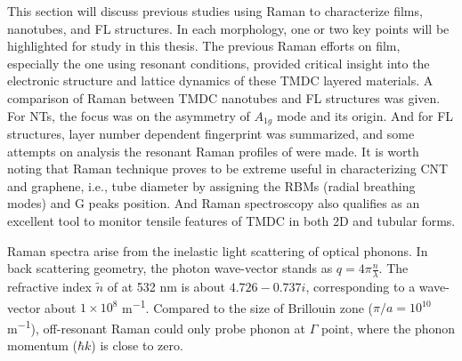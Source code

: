 This section will discuss previous studies using Raman to characterize  films, nanotubes, and FL structures. In each morphology, one or two key points will be highlighted for study in this thesis. The previous Raman efforts on  film, especially the one using resonant conditions, provided critical insight into the electronic structure and lattice dynamics of these TMDC layered materials. A comparison of Raman between TMDC nanotubes and FL structures was given. For  NTs, the focus was on the asymmetry of $A_{1g}$ mode and its origin. And for  FL structures, layer number dependent fingerprint was summarized, and some attempts on analysis the resonant Raman profiles of  were made. It is worth noting that Raman technique proves to be extreme useful in characterizing CNT and graphene, i.e., tube diameter by assigning the RBMs (radial breathing modes) and G peaks position.\cite{Bonaccorso2013} And Raman spectroscopy also qualifies as an excellent tool to monitor tensile features of TMDC in both 2D and tubular forms.\cite{Tang2013} 

Raman spectra arise from the inelastic light scattering of optical phonons. In back scattering geometry, the photon wave-vector stands as $q = 4\pi\frac{n}{\lambda}$. The refractive index $\tilde{n}$ of  at 532 nm is about $4.726 - 0.737i$,\cite{Beal1976, Peimyoo2013} corresponding to a wave-vector about $1\times10^8$ \si{m^{-1}}. Compared to the size of Brillouin zone ($\pi/a = 10^{10}$ \si{m^{-1}}), off-resonant Raman could only probe phonon at $\Gamma$ point, where the phonon momentum ($\hbar k$) is close to zero. 

